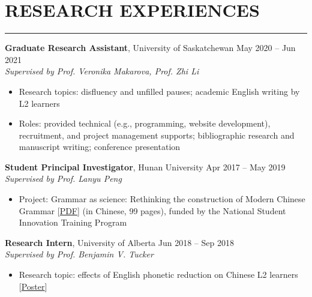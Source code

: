 \documentclass[a4paper, 11pt]{article}  %
\begin{document}
\section*{RESEARCH EXPERIENCES}
\hrule 
\vspace{11pt}

\textbf{Graduate Research Assistant}, University of Saskatchewan \hfill May 2020 – Jun 2021 \vspace{3pt} \\ 
\emph{Supervised by Prof. Veronika Makarova, Prof. Zhi Li}

\begin{itemize}
	\itemsep0em 
	
	\item{Research topics: disfluency and unfilled pauses; academic English writing by L2 learners}
	\item{Roles: provided technical (e.g., programming, website development), recruitment, and project management supports; bibliographic research and manuscript writing; conference presentation}
	
\end{itemize}

\vspace{11pt}

\noindent
\textbf{Student Principal Investigator}, Hunan University \hfill Apr 2017 – May 2019 \vspace{3pt} \\ 
\emph{Supervised by Prof. Lanyu Peng}
\begin{itemize}
	\itemsep0em 
	
	\item{Project: Grammar as science: Rethinking the construction of Modern Chinese Grammar [\href{https://drive.google.com/file/d/1h_u2THzdFSRTRMPgM2UDXj7O_dGkJAN3/view}{PDF}] (in Chinese, 99 pages), funded by the National Student Innovation Training Program}
	
\end{itemize}

\vspace{11pt}

\noindent
\textbf{Research Intern}, University of Alberta \hfill Jun 2018 – Sep 2018 \vspace{3pt} \\ 
\emph{Supervised by Prof. Benjamin V. Tucker}
\begin{itemize}
	\itemsep0em 
	
	\item{Research topic: effects of English phonetic reduction on Chinese L2 learners [\href{https://drive.google.com/file/d/1Pq59XVx5zYgCazE93btu9G8RI6Mk_tVC/view}{Poster}]}
	
\end{itemize}
\end{document}
